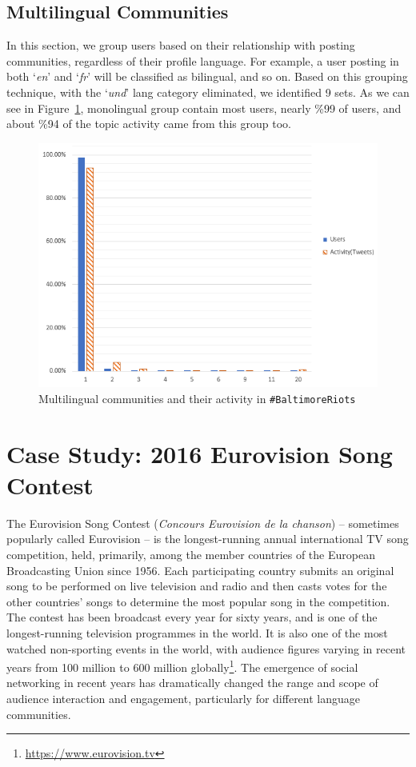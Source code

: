 \subsection{Multilingual Communities}
In this section, we group users based on their relationship with
posting communities, regardless of their profile language. For
example, a user posting in both `{\emph{en}}' and `{\emph{fr}}' will
be classified as bilingual, and so on. Based on this grouping
technique, with the `{\emph{und}}' lang category eliminated, we
identified 9 sets. As we can see in Figure~\ref{fig:baltimore_multilingual}, monolingual group contain most users, nearly \%99 of users, and about \%94 
of the topic activity came from this group too.
\begin{figure}
\centering
\includegraphics[width=\columnwidth]{images/baltimore_multilingual.png}
\caption{Multilingual communities and their activity in {\texttt{\#BaltimoreRiots}}}
\label{fig:baltimore_multilingual}
\end{figure}


\section{Case Study: 2016 Eurovision Song Contest}\label{eurovisioncasestudy}

The Eurovision Song Contest ({\emph{Concours Eurovision de la
chanson}}) -- sometimes popularly called Eurovision -- is the
longest-running annual international TV song competition, held,
primarily, among the member countries of the European Broadcasting
Union since 1956. Each participating country submits an original
song to be performed on live television and radio and then casts votes
for the other countries' songs to determine the most popular song in
the competition. The contest has been broadcast every year for sixty
years, and is one of the longest-running television programmes in the
world. It is also one of the most watched non-sporting events in the
world, with audience figures varying in recent years from 100 million
to 600 million globally\footnote{\url{https://www.eurovision.tv}}. The
emergence of social networking in recent years has dramatically
changed the range and scope of audience interaction and engagement,
particularly for different language communities.

